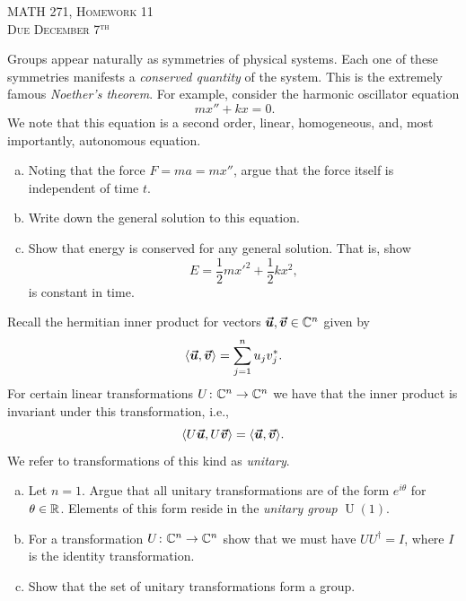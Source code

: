 \documentclass[12pt]{article} %
\begin{document}
\begin{center}
   \textsc{\large MATH 271, Homework 11}\\
   \textsc{Due December 7$^\textrm{th}$}
\end{center}
\vspace{.5cm}

\begin{problem}
Groups appear naturally as symmetries of physical systems. Each one of these symmetries manifests a \emph{conserved quantity} of the system. This is the extremely famous \emph{Noether's theorem}. For example, consider the harmonic oscillator equation
\[\
mx'' + k x = 0.
\]
We note that this equation is a second order, linear, homogeneous, and, most importantly, autonomous equation. 
\begin{enumerate}[(a)]
    \item Noting that the force $F=ma=mx''$, argue that the force itself is independent of time $t$.
    \item Write down the general solution to this equation.
    \item Show that energy is conserved for any general solution. That is, show
    \[
    E = \frac{1}{2}mx'^2 + \frac{1}{2}kx^2,
    \]
    is constant in time.
\end{enumerate}
\end{problem}

\begin{problem}
    Recall the hermitian inner product for vectors $\boldsymbol{\vec{u}},\boldsymbol{\vec{v}} \in \mathbb{C}^n$ given by
    \[
    \langle \boldsymbol{\vec{u}},\boldsymbol{\vec{v}} \rangle = \sum_{j=1}^n u_j v_j^*.
    \]
    For certain linear transformations $U \colon \mathbb{C}^n \to \mathbb{C}^n$ we have that the inner product is invariant under this transformation, i.e.,
    \[
    \langle U \boldsymbol{\vec{u}},U \boldsymbol{\vec{v}} \rangle = \langle \boldsymbol{\vec{u}},\boldsymbol{\vec{v}} \rangle.
    \]
    We refer to transformations of this kind as \emph{unitary}.
    \begin{enumerate}[(a)]
        \item Let $n=1$. Argue that all unitary transformations are of the form $e^{i\theta}$ for $\theta \in \mathbb{R}$. Elements of this form reside in the \emph{unitary group} $\operatorname{U}(1)$.
        \item For a transformation $U\colon \mathbb{C}^n \to \mathbb{C}^n$ show that we must have $UU^\dagger = I$, where $I$ is the identity transformation.
        \item Show that the set of unitary transformations form a group.
    \end{enumerate}
\end{problem}
\end{document}
